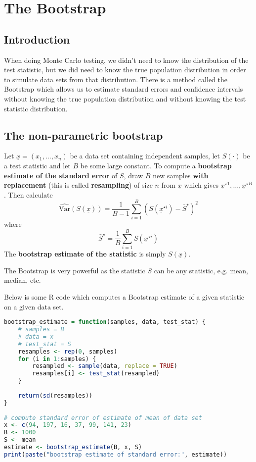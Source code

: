 \section{The Bootstrap}

\subsection{Introduction}

When doing Monte Carlo testing, we didn't need to know the distribution of the test statistic, but we did need to know the true population distribution in order to simulate data sets from that distribution. There is a method called the Bootstrap which allows us to estimate standard errors and confidence intervals without knowing the true population distribution and without knowing the test statistic distribution.

\subsection{The non-parametric bootstrap}

\begin{definition}
	Let $\underline{x} = (x_1, \dots, x_n)$ be a data set containing independent samples, let $S(\cdot)$ be a test statistic and let $B$ be some large constant. To compute a \textbf{bootstrap estimate of the standard error} of $S$, draw $B$ new samples \textbf{with replacement} (this is called \textbf{resampling}) of size $n$ from $\underline{x}$ which gives $\underline{x}^{\star 1}, \dots, \underline{x}^{\star B}$. Then calculate
	\[
		\widehat{\text{Var}}(S(\underline{x})) = \frac{1}{B - 1} \sum_{i = 1}^B {\left( S(\underline{x}^{\star i}) - \bar{S}^{\star} \right)}^2 
	\]
	where
	\[
		\bar{S}^{\star} = \frac{1}{B} \sum_{i = 1}^B S \left( \underline{x}^{\star i} \right)
	\]
	The \textbf{bootstrap estimate of the statistic} is simply $S(\underline{x})$.
\end{definition}

\begin{remark}
	The Bootstrap is very powerful as the statistic $S$ can be any statistic, e.g. mean, median, etc.
\end{remark}

\begin{example}
	Below is some R code which computes a Bootstrap estimate of a given statistic on a given data set.

	\begin{lstlisting}[language=R]
bootstrap_estimate = function(samples, data, test_stat) {
	# samples = B
	# data = x
	# test_stat = S
	resamples <- rep(0, samples)
	for (i in 1:samples) {
		resampled <- sample(data, replace = TRUE)
		resamples[i] <- test_stat(resampled)
	}
	
	return(sd(resamples))
}
		  
# compute standard error of estimate of mean of data set
x <- c(94, 197, 16, 37, 99, 141, 23)
B <- 1000
S <- mean
estimate <- bootstrap_estimate(B, x, S)
print(paste("bootstrap estimate of standard error:", estimate))
	\end{lstlisting}
\end{example}

